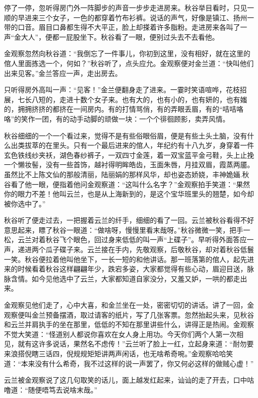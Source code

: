 \documentclass[12pt,UTF8]{ctexbook}
\begin{document}
{{{停了一停，忽听得房门外一阵脚步的声音一步步走进房来。秋谷举目看时，只见一顺的早进来三个女子，一色的都穿着竹布衫裤。说话的声气，好像是镇江、扬州一带的口音。眉目口鼻都生得不大平正，脸上却搽着许多脂粉。走进房来各叫了一声“金大人”，便都一屁股坐下。秋谷看了一眼，便别过头去不去看他。

金观察忽然向秋谷道：“我倒忘了一件事儿，你初到这里，没有相好，就在这里的倌人里面拣选一个，何如？”秋谷听了，点头应允。金观察便对金兰道：“快叫他们出来见客。”金兰答应一声，走出房去。

只听得房外高叫一声：“见客！”金兰便翻身走了进来。一霎时笑语喧哗，花枝招展，七长八短的，走进十数个女子来。也有大的，也有小的，也有妍的，也有媸的，拥拥挤挤的都挤在一间房内。有的打情骂俏，有的弄眼丢眉，有的“咭咭咯咯”的笑作一团，有的动手动脚的顽做一块：一个个徘徊顾影，卖弄风情。

秋谷细细的一个一个看过来，觉得不是有些俗眼俗眉，便是有些土头土脑，没有什么出类拔萃的在里头。只有一个最后进来的倌人，年纪约有十八九岁，身穿着一件玄色铁线纱夹袄，湖色春纱裤子，一双四寸金莲，着一双宝蓝平金弓鞋，头上止挽一个懒妆髻，没有一些首饰，越衬得明眸皓齿，玉面朱唇，月挂双眉，霞蒸两靥。虽然比不上陈文仙的那般清丽，陆丽娟的那样风华，却也姿态娇娆，丰神姽婳.秋谷看了他一眼，便指着他问金观察道：“这叫什么名字？”金观察拍手笑道：“果然你的眼力不差！他叫云兰，也是从上海新到的，是这个宝华班里头的翘楚，如今却被你选中了。”

秋谷听了便走过去，一把握着云兰的纤手，细细的看了一回。云兰被秋谷看得不好意思起来，瞟了秋谷一眼道：“做啥呀，慢慢里看末哉呀。”秋谷微微一笑，把手一松，云兰对着秋谷飞个眼色，回过身来低低的叫一声“上碟子”。早听得外面答应一声，递进两个瓜子碟子来。云兰接在手内，先敬观察，后敬秋谷，却对着秋谷低鬟一笑。秋谷便拉着他叫他坐下，一长一短的和他讲话。那一班落第的倌人，起先进来的时候看着秋谷这样翩翩年少，跌宕多姿，大家都觉得有些心动，眉迎目送，脉脉含情。如今见他选中了云兰，大家都知道自家没分，又羞又妒，一哄的都走出来。

金观察见他们走了，心中大喜，和金兰坐在一处，密密切切的讲话。讲了一回，金观察便叫金兰预备摆酒，取过请客的纸片，写了几张客票。忽然抬起头来，见秋谷和云兰并肩执手的坐在那里，低低的不知在那里讲些什么，讲得正是热闹。金观察不觉大笑道：“怪道别人都说你喜欢在女人身上用功。今天你们两个人第一次相见，就有这许多说话，果然名不虑传！”云兰听了脸上一红，立起身来道：“耐勿要来浪搭倪瞎三话四，倪规规矩矩讲两声闲话，也无啥希奇啘。”金观察哈哈笑道：“本来没有什么希奇，我不过这样的说一声罢了，你又何必这样的做贼心虚！”

云兰被金观察说了这几句取笑的话儿，面上越发红起来，讪讪的走了开去，口中咕噜道：“随便唔笃去说啥末哉。”

}}}
\end{document}
